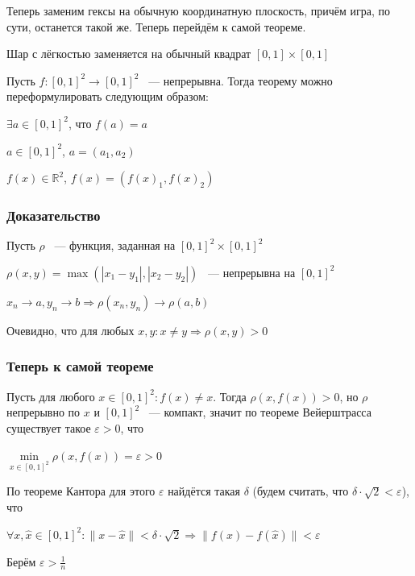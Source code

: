 \documentclass{article}
\begin{document}
			Теперь заменим гексы на обычную координатную плоскость, причём игра, по сути, останется такой же. Теперь перейдём к самой теореме.
			
			Шар с лёгкостью заменяется на обычный квадрат $[0, 1] \times [0, 1]$
			
			Пусть $f : [0, 1]^2 \rightarrow [0, 1]^2$ ~--- непрерывна. Тогда теорему можно переформулировать следующим образом:
			
			$\exists a \in [0, 1]^2$, что $f(a) = a$
			
			$a \in [0, 1]^2$, $a = (a_1, a_2)$
			
			$f(x) \in \mathbb{R}^2$, $f(x) = (f(x)_1, f(x)_2)$
			
        \subsubsection{Доказательство}
			
			Пусть $\rho$ ~--- функция, заданная на $[0, 1]^2 \times [0, 1]^2$
				
			$\rho(x, y) = \max \left(|x_1 - y_1|, |x_2 - y_2|\right)$ ~--- непрерывна на $[0, 1]^2$
			
			$x_n \rightarrow a, y_n \rightarrow b \Longrightarrow \rho(x_n, y_n) \rightarrow \rho(a, b)$
				
			Очевидно, что для любых $x, y: x \neq y \Longrightarrow \rho(x, y) > 0$
				
		\subsubsection{Теперь к самой теореме}
				
            Пусть для любого $x \in [0, 1]^2 : f(x) \neq x$. Тогда $\rho(x, f(x)) > 0$, но $\rho$ непрерывно по $x$ и $[0, 1]^2$ ~--- компакт, значит по теореме Вейерштрасса существует такое $\varepsilon > 0$, что
				
			$\min\limits_{x \in [0, 1]^2} \rho(x, f(x)) = \varepsilon > 0$
				
			По теореме Кантора для этого $\varepsilon$ найдётся такая $\delta$ (будем считать, что $\delta \cdot \sqrt{2} < \varepsilon$), что
				
			$\forall x, \widehat{x} \in [0, 1]^2 : \| x - \widehat{x} \| < \delta \cdot \sqrt{2} \Longrightarrow \| f(x) - f(\widehat{x}) \| < \varepsilon$
				
			Берём $\varepsilon > \frac{1}{n}$
				
\end{document}
